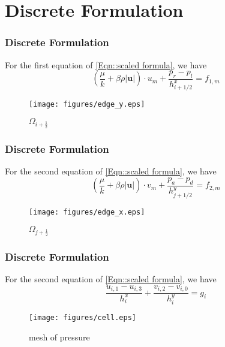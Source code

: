 \documentclass[notheorems,serif]{beamer}
\begin{document}
\section{Discrete Formulation}
\begin{frame}
\frametitle{Discrete Formulation}
For the first equation of \eqref{Eqn::scaled formula}, we have
\begin{equation}\label{Eqn:um}
(\frac{\mu}{k} + \beta\rho\left|\boldsymbol{u}\right|) \cdot u_m + \frac{p_r - p_l}{h^x_{i+1/2}} = f_{1,m}
\end{equation}

\begin{figure}[H] 
\centering 
\texttt{[image: figures/edge\_y.eps]} 
\caption{$\Omega_{i+\frac{1}{2}}$} 
\label{fig:Oi+0.5}
\end{figure}
\end{frame}
\begin{frame}

\frametitle{Discrete Formulation}
For the second equation of \eqref{Eqn::scaled formula}, we have
\begin{equation}\label{Eqn:vm}
(\frac{\mu}{k} + \beta\rho\left|\boldsymbol{u}\right|) \cdot v_m + \frac{p_a - p_d}{h^y_{j+1/2}} = f_{2,m}
\end{equation}

\begin{figure}[H] 
\centering 
\texttt{[image: figures/edge\_x.eps]} 
\caption{$\Omega_{j+\frac{1}{2}}$} 
\label{fig:Oj+0.5}  
\end{figure}
\end{frame}

\begin{frame}
\frametitle{Discrete Formulation}
For the second equation of \eqref{Eqn::scaled formula}, we have
\begin{equation}\label{Eqn:uv}
\frac{u_{i,1} - u_{i,3}}{h^x_i} + \frac{v_{i,2} - v_{i,0}}{h^y_i} = g_i
\end{equation}

\begin{figure}[H] 
\centering 
\texttt{[image: figures/cell.eps]} 
\caption{mesh of pressure} 
\label{fig:label}
\end{figure}
\end{frame}
\end{document}
